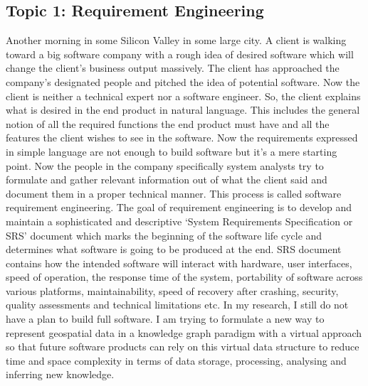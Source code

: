 \documentclass[10.9pt]{article}
\begin{document}
\subsection*{ Topic 1: Requirement Engineering }
Another morning in some Silicon Valley in some large city.  A client is walking toward a big software company with a rough idea of desired software which will change the client’s business output massively. The client has approached the company’s designated people and pitched the idea of potential software. Now the client is neither a technical expert nor a software engineer. So, the client explains what is desired in the end product in natural language. This includes the general notion of all the required functions the end product must have and all the features the client wishes to see in the software. Now the requirements expressed in simple language are not enough to build software but it’s a mere starting point. Now the people in the company specifically system analysts try to formulate and gather relevant information out of what the client said and document them in a proper technical manner. This process is called software requirement engineering. The goal of requirement engineering is to develop and maintain a sophisticated and descriptive ‘System Requirements Specification or SRS’ document which marks the beginning of the software life cycle and determines what software is going to be produced at the end. SRS document contains how the intended software will interact with hardware, user interfaces, speed of operation, the response time of the system, portability of software across various platforms, maintainability, speed of recovery after crashing, security, quality assessments and technical limitations etc.
In my research, I still do not have a plan to build full software. I am trying to formulate a new way to represent geospatial data in a knowledge graph paradigm with a virtual approach so that future software products can rely on this virtual data structure to reduce time and space complexity in terms of data storage, processing, analysing and inferring new knowledge.
 
\end{document}
